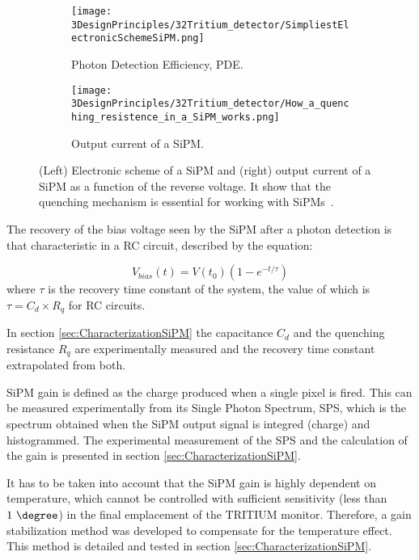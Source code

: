 \begin{figure}
\centering
    \begin{subfigure}[b]{0.45\textwidth}
    \centering
    \texttt{[image: 3DesignPrinciples/32Tritium\_detector/SimpliestElectronicSchemeSiPM.png]}  
    \caption{Photon Detection Efficiency, PDE.\label{subfig:ElectricModelSiPM}}
    \end{subfigure}
    \hfill
    \begin{subfigure}[b]{0.45\textwidth}
    \centering
    \texttt{[image: 3DesignPrinciples/32Tritium\_detector/How\_a\_quenching\_resistence\_in\_a\_SiPM\_works.png]}  
    \caption{Output current of a SiPM.\label{subfig:HowSiPMworks}}
    \end{subfigure}
 \caption{(Left) Electronic scheme of a SiPM and (right) output current of a SiPM as a function of the reverse voltage. It show that the quenching mechanism is essential for working with SiPMs~\cite{DataSheetSensL}.}
 \label{fig:ChenchingResistance}
\end{figure}

The recovery of the bias voltage seen by the SiPM after a photon detection is that characteristic in a RC circuit, described by the equation: 

\begin{equation}
V_{bias}(t)=V(t_0)\left(1-e^{-t/\tau} \right)
\label{RCCircuitBiasVoltage}
\end{equation}
where $\tau$ is the recovery time constant of the system, the value of which is $\tau=C_d \times R_q$ for RC circuits.

In section \ref{sec:CharacterizationSiPM} the capacitance $C_d$ and the quenching resistance $R_q$ are experimentally measured and the recovery time constant extrapolated from both.

SiPM gain is defined as the charge produced when a single pixel is fired. This can be measured experimentally from its Single Photon Spectrum, SPS, which is the spectrum obtained when the SiPM output signal is integred (charge) and histogrammed. The experimental measurement of the SPS and the calculation of the gain is presented in section \ref{sec:CharacterizationSiPM}.

It has to be taken into account that the SiPM gain is highly dependent on temperature, which cannot be controlled with sufficient sensitivity (less than $1~\degree$) in the final emplacement of the TRITIUM monitor. Therefore, a gain stabilization method was developed to compensate for the temperature effect. This method is detailed and tested in section \ref{sec:CharacterizationSiPM}.

